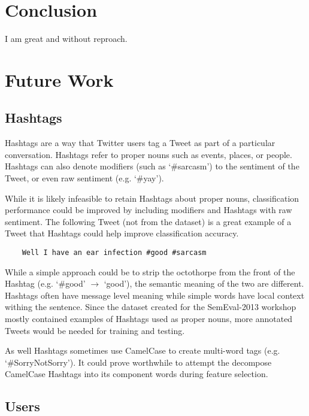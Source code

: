 \documentclass[12pt]{article}
\begin{document}
\section{Conclusion}

I am great and without reproach.


\section{Future Work}

\subsection{Hashtags}

Hashtags are a way that Twitter users tag a Tweet as part of a particular
conversation. Hashtags refer to proper nouns such as events, places, or people.
Hashtags can also denote modifiers (such as `\#sarcasm') to the sentiment of the
Tweet, or even raw sentiment (e.g. `\#yay').

While it is likely infeasible to retain Hashtags about proper nouns,
classification performance could be improved by including modifiers and
Hashtags with raw sentiment. The following Tweet (not from the dataset) is a
great example of a Tweet that Hashtags could help improve classification
accuracy.

\begin{verbatim}
    Well I have an ear infection #good #sarcasm
\end{verbatim}

While a simple approach could be to strip the octothorpe from the front of the
Hashtag (e.g. `\#good' $\rightarrow$ `good'), the semantic meaning of the two
are different. Hashtags often have message level meaning while simple words
have local context withing the sentence. Since the dataset created for the
SemEval-2013 workshop mostly contained examples of Hashtags used as proper
nouns, more annotated Tweets would be needed for training and testing.

As well Hashtags sometimes use CamelCase to create multi-word tags (e.g.
`\#SorryNotSorry'). It could prove worthwhile to attempt the decompose
CamelCase Hashtags into its component words during feature selection.

\subsection{Users}
\end{document}
